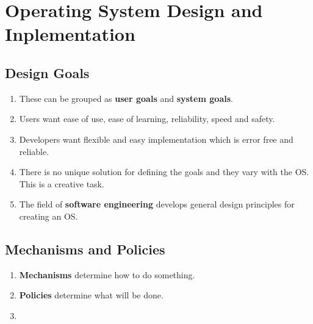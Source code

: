 \documentclass[journal,12pt,twocolumn]{IEEEtran}
\begin{document}
\section{Operating System Design and Inplementation}
\subsection{Design Goals}
\begin{enumerate}
    \item These can be grouped as \textbf{user goals} and \textbf{system goals}.
    \item Users want ease of use, ease of learning, reliability, speed and 
    safety.
    \item Developers want flexible and easy implementation which is error free 
    and reliable.
    \item There is no unique solution for defining the goals and they vary with 
    the OS. This is a creative task.
    \item The field of \textbf{software engineering} develops general design 
    principles for creating an OS.
\end{enumerate}

\subsection{Mechanisms and Policies}
\begin{enumerate}
    \item \textbf{Mechanisms} determine how to do something.
    \item \textbf{Policies} determine what will be done.
    \item 
\end{enumerate}
\end{document}
